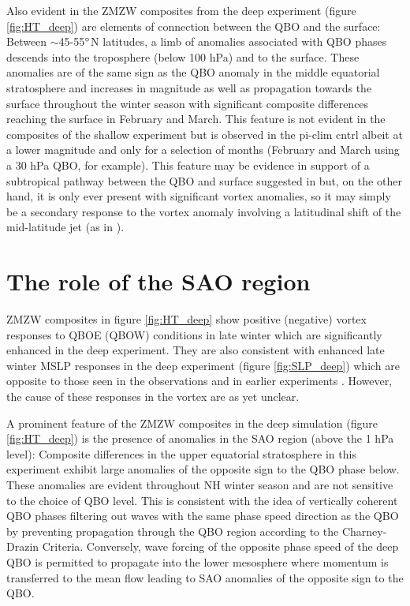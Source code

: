 Also evident in the ZMZW composites from the deep experiment (figure \ref{fig:HT_deep}) are elements of connection between the QBO and the surface: Between $\sim$45-55$\degree$N latitudes, a limb of anomalies associated with QBO phases descends into the troposphere (below 100 hPa) and to the surface. These anomalies are of the same sign as the QBO anomaly in the middle equatorial stratosphere and increases in magnitude as well as propagation towards the surface throughout the winter season with significant composite differences reaching the surface in February and March. This feature is not evident in the composites of the shallow experiment but is observed in the pi-clim cntrl albeit at a lower magnitude and only for a selection of months (February and March using a 30 hPa QBO, for example). This feature may be evidence in support of a subtropical pathway between the QBO and surface suggested in \cite{graySurface2018b} but, on the other hand, it is only ever present with significant vortex anomalies, so it may simply be a secondary response to the vortex anomaly involving a latitudinal shift of the mid-latitude jet (as in \cite{baldwinStratospheric2001a}). 

\section{The role of the SAO region}
\label{sec:role_SAO}

ZMZW composites in figure \ref{fig:HT_deep} show positive (negative) vortex responses to QBOE (QBOW) conditions in late winter which are significantly enhanced in the deep experiment. They are also consistent with enhanced late winter MSLP responses in the deep experiment (figure \ref{fig:SLP_deep}) which are opposite to those seen in the observations \citep{graySurface2018b} and in earlier experiments \citep{andrewsObserved2019d}. However, the cause of these responses in the vortex are as yet unclear. 

A prominent feature of the ZMZW composites in the deep simulation (figure \ref{fig:HT_deep}) is the presence of anomalies in the SAO region (above the 1 hPa level): Composite differences in the upper equatorial stratosphere in this experiment exhibit large anomalies of the opposite sign to the QBO phase below. These anomalies are evident throughout NH winter season and are not sensitive to the choice of QBO level. This is consistent with the idea of vertically coherent QBO phases filtering out waves with the same phase speed direction as the QBO by preventing propagation through the QBO region according to the Charney-Drazin Criteria. Conversely, wave forcing of the opposite phase speed of the deep QBO is permitted to propagate into the lower mesosphere where momentum is transferred to the mean flow leading to SAO anomalies of the opposite sign to the QBO. 

